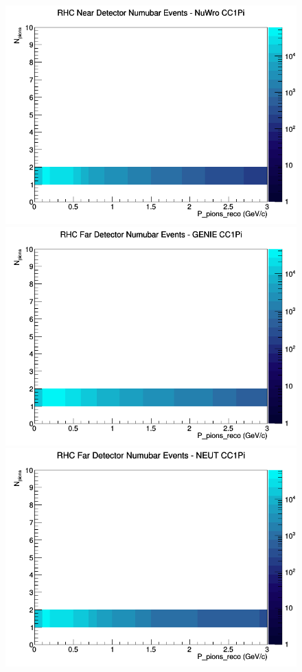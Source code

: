 \documentclass[12pt]{article}
\begin{document}
\begin{figure}[h]
\includegraphics[width=\linewidth]{eff_N_P/LAr/pions/CC1Pi_RHC_ND_numubar_N_P_NuWro.png}
\endminipage
\newline
{}
\includegraphics[width=\linewidth]{eff_N_P/LAr/pions/CC1Pi_RHC_FD_numubar_N_P_GENIE.png}
\endminipage
{}
\includegraphics[width=\linewidth]{eff_N_P/LAr/pions/CC1Pi_RHC_FD_numubar_N_P_NEUT.png}

\end{figure}
\end{document}
